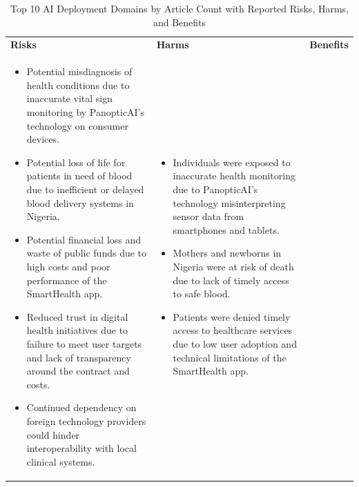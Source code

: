 \begin{longtable}{p{5.2cm}|p{5.2cm}|p{5.2cm}}
\caption{Top 10 AI Deployment Domains by Article Count with Reported Risks, Harms, and Benefits}
\label{tab:top_domains_detailed}\\
\endfirsthead

\endhead

\endfoot

\endlastfoot

\multicolumn{3}{l}{\textbf{\large Health and Healthcare} \textit{(N=76 articles)}} \\
\midrule
\textbf{Risks} & \textbf{Harms} & \textbf{Benefits} \\
\midrule
\begin{itemize}[leftmargin=*, nosep, before=\vspace{-0.5\baselineskip}, after=\vspace{-0.5\baselineskip}] 
\footnotesize
\item Potential misdiagnosis of health conditions due to inaccurate vital sign monitoring by PanopticAI's technology on consumer devices.
\item Potential loss of life for patients in need of blood due to inefficient or delayed blood delivery systems in Nigeria.
\item Potential financial loss and waste of public funds due to high costs and poor performance of the SmartHealth app.
\item Reduced trust in digital health initiatives due to failure to meet user targets and lack of transparency around the contract and costs.
\item Continued dependency on foreign technology providers could hinder interoperability with local clinical systems.
\end{itemize} & \begin{itemize}[leftmargin=*, nosep, before=\vspace{-0.5\baselineskip}, after=\vspace{-0.5\baselineskip}] 
\footnotesize
\item Individuals were exposed to inaccurate health monitoring due to PanopticAI's technology misinterpreting sensor data from smartphones and tablets.
\item Mothers and newborns in Nigeria were at risk of death due to lack of timely access to safe blood.
\item Patients were denied timely access to healthcare services due to low user adoption and technical limitations of the SmartHealth app.

\end{itemize}
\end{longtable}
